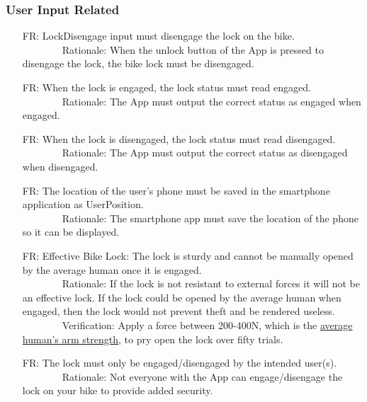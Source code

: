 \documentclass[12pt]{article}
\newcounter{reqnum} %
\begin{document}
\subsubsection{User Input Related}
\begin{itemize}
\setlength{\itemindent}{.5in}
\item[FR\refstepcounter{reqnum}\thereqnum\label{FRDisengage}:] LockDisengage input must disengage the lock on the bike.
\\ \-\ \-\ \-\ \-\ \-\ \-\ \-\ \-\ Rationale: When the unlock button of the App is pressed to disengage the lock, the bike lock must be disengaged.
\item[FR\refstepcounter{reqnum}\thereqnum\label{FRLockStatusEngaged}:] When the lock is engaged, the lock status must read engaged.
\\ \-\ \-\ \-\ \-\ \-\ \-\ \-\ \-\ Rationale: The App must output the correct status as engaged when engaged.
\item[FR\refstepcounter{reqnum}\thereqnum\label{FRLockStatusDisengaged}:] When the lock is disengaged, the lock status must read disengaged.
\\ \-\ \-\ \-\ \-\ \-\ \-\ \-\ \-\ Rationale: The App must output the correct status as disengaged when disengaged.
\item[FR\refstepcounter{reqnum}\thereqnum\label{FRUserPos}:] The location of the user’s phone must be saved in the smartphone application as UserPosition.
\\ \-\ \-\ \-\ \-\ \-\ \-\ \-\ \-\ Rationale: The smartphone app must save the location of the phone so it can be displayed.
\item[FR\refstepcounter{reqnum}\thereqnum\label{FRSturdy}:] Effective Bike Lock: The lock is sturdy and cannot be manually opened by the average human once it is engaged.
\\ \-\ \-\ \-\ \-\ \-\ \-\ \-\ \-\ Rationale: If the lock is not resistant to external forces it will not be an effective lock. If the lock could be opened by the average human when engaged, then the lock would not prevent theft and be rendered useless.
\\ \-\ \-\ \-\ \-\ \-\ \-\ \-\ \-\ Verification: Apply a force between 200-400N, which is the \href{https://www.tandfonline.com/doi/pdf/10.1080/10803548.2004.11076594?cookieSet=1}{average human's arm strength}, to pry open the lock over fifty trials. 
\item[FR\refstepcounter{reqnum}\thereqnum\label{FRCorrectUser}:] The lock must only be engaged/disengaged by the intended user(s).
\\ \-\ \-\ \-\ \-\ \-\ \-\ \-\ \-\ Rationale: Not everyone with the App can engage/disengage the lock on your bike to provide added security.
\end{itemize}
\end{document}
